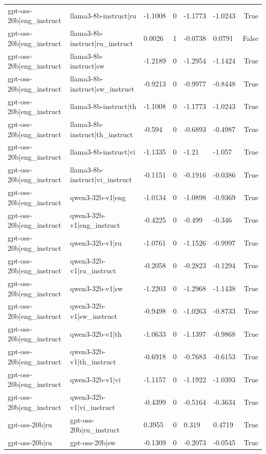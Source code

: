 \begin{table}
\begin{tabular}{llllllr}
gpt-oss-20b|eng_instruct & llama3-8b-instruct|ru & -1.1008 & 0 & -1.1773 & -1.0243 & True \\
gpt-oss-20b|eng_instruct & llama3-8b-instruct|ru_instruct & 0.0026 & 1 & -0.0738 & 0.0791 & False \\
gpt-oss-20b|eng_instruct & llama3-8b-instruct|sw & -1.2189 & 0 & -1.2954 & -1.1424 & True \\
gpt-oss-20b|eng_instruct & llama3-8b-instruct|sw_instruct & -0.9213 & 0 & -0.9977 & -0.8448 & True \\
gpt-oss-20b|eng_instruct & llama3-8b-instruct|th & -1.1008 & 0 & -1.1773 & -1.0243 & True \\
gpt-oss-20b|eng_instruct & llama3-8b-instruct|th_instruct & -0.594 & 0 & -0.6893 & -0.4987 & True \\
gpt-oss-20b|eng_instruct & llama3-8b-instruct|vi & -1.1335 & 0 & -1.21 & -1.057 & True \\
gpt-oss-20b|eng_instruct & llama3-8b-instruct|vi_instruct & -0.1151 & 0 & -0.1916 & -0.0386 & True \\
gpt-oss-20b|eng_instruct & qwen3-32b-v1|eng & -1.0134 & 0 & -1.0898 & -0.9369 & True \\
gpt-oss-20b|eng_instruct & qwen3-32b-v1|eng_instruct & -0.4225 & 0 & -0.499 & -0.346 & True \\
gpt-oss-20b|eng_instruct & qwen3-32b-v1|ru & -1.0761 & 0 & -1.1526 & -0.9997 & True \\
gpt-oss-20b|eng_instruct & qwen3-32b-v1|ru_instruct & -0.2058 & 0 & -0.2823 & -0.1294 & True \\
gpt-oss-20b|eng_instruct & qwen3-32b-v1|sw & -1.2203 & 0 & -1.2968 & -1.1438 & True \\
gpt-oss-20b|eng_instruct & qwen3-32b-v1|sw_instruct & -0.9498 & 0 & -1.0263 & -0.8733 & True \\
gpt-oss-20b|eng_instruct & qwen3-32b-v1|th & -1.0633 & 0 & -1.1397 & -0.9868 & True \\
gpt-oss-20b|eng_instruct & qwen3-32b-v1|th_instruct & -0.6918 & 0 & -0.7683 & -0.6153 & True \\
gpt-oss-20b|eng_instruct & qwen3-32b-v1|vi & -1.1157 & 0 & -1.1922 & -1.0393 & True \\
gpt-oss-20b|eng_instruct & qwen3-32b-v1|vi_instruct & -0.4399 & 0 & -0.5164 & -0.3634 & True \\
gpt-oss-20b|ru & gpt-oss-20b|ru_instruct & 0.3955 & 0 & 0.319 & 0.4719 & True \\
gpt-oss-20b|ru & gpt-oss-20b|sw & -0.1309 & 0 & -0.2073 & -0.0545 & True \\

\end{tabular}
\end{table}
